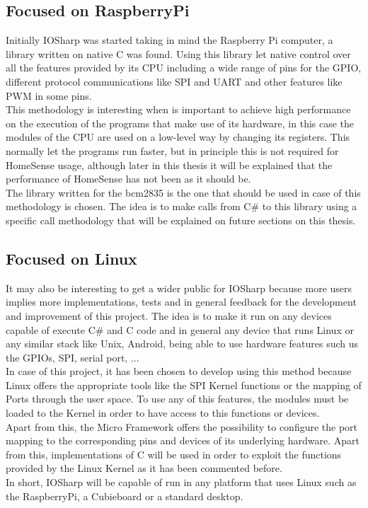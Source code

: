 \subsection{Focused on RaspberryPi}\label{SS:IOSharp-RPI}
Initially IOSharp was started taking in mind the Raspberry Pi computer, a library written on native C was found. Using this library let native control over all the features provided by its CPU including a wide range of pins for the GPIO, different protocol communications like \gls{SPI} and \gls{UART} and other features like \gls{PWM} in some pins.
\\
This methodology is interesting when is important to achieve high performance on the execution of the programs that make use of its hardware, in this case the modules of the CPU are used on a low-level way by changing its registers. This normally let the programs run faster, but in principle this is not required for HomeSense usage, although later in this thesis it will be explained that the performance of HomeSense has not been as it should be.
\\
The library written for the bcm2835 is the one that should be used in case of this methodology is chosen. The idea is to make calls from C\# to this library using a specific call methodology that will be explained on future sections on this thesis.

\subsection{Focused on Linux}\label{SS:IOSharp-Linux}
It may also be interesting to get a wider public for IOSharp because more users implies more implementations, tests and in general feedback for the development and improvement of this project. The idea is to make it run on any devices capable of execute C\# and C code and in general any device that runs Linux or any similar stack like Unix, Android, being able to use hardware features such us the GPIOs, SPI, serial port, ...
\\
In case of this project, it has been chosen to develop using this method because Linux offers the appropriate tools like the SPI Kernel functions or the mapping of Ports through the user space. To use any of this features, the modules must be loaded to the Kernel in order to have access to this functions or devices.
\\
Apart from this, the Micro Framework offers the possibility to configure the port mapping to the corresponding pins and devices of its underlying hardware. Apart from this, implementations of C will be used in order to exploit the functions provided by the Linux Kernel as it has been commented before.
\\
In short, IOSharp will be capable of run in any platform that uses Linux such as the RaspberryPi, a Cubieboard or a standard desktop.

